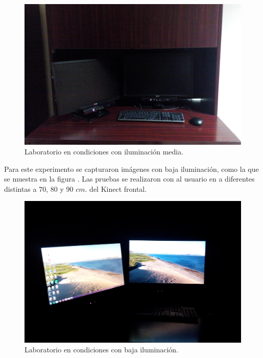 \begin{figure}[h!]
\begin{center} 
\includegraphics[scale=0.11]{./Figures/mediailuminacion.jpg}
\end{center}
\caption{Laboratorio en condiciones con iluminación media.}
\label{fig:LabMedioIluminado} 
\end{figure} 

Para este experimento se capturaron imágenes con baja iluminación, como la que se muestra en la figura . Las pruebas se realizaron con al usuario en a diferentes distintas a $70$, $80$ y $90$ $cm.$ del Kinect frontal. 

\begin{figure}[h!]
\begin{center} 
\includegraphics[scale=0.11]{./Figures/noIluminacion.jpg}
\end{center}
\caption{Laboratorio en condiciones con baja iluminación.}
\label{fig:LabNoIluminado} 
\end{figure}

